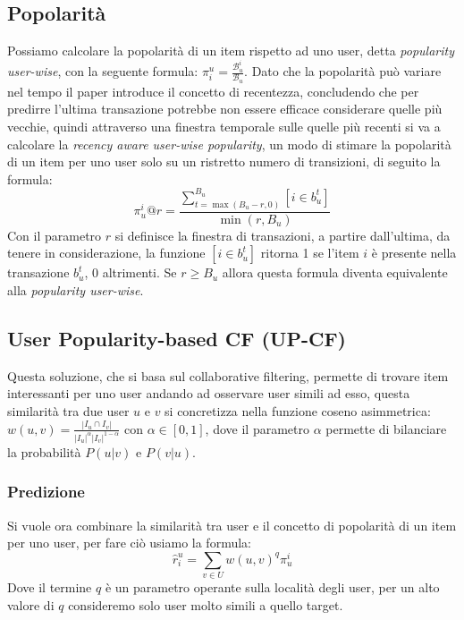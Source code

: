 \subsection{Popolarità}
Possiamo calcolare la popolarità di un item rispetto ad uno user, detta \textit{popularity user-wise}, con la seguente formula: $\pi_{i}^{u} = \frac{\mathcal{B}_{u}^{i}}{\mathcal{B}_{u}}$.
Dato che la popolarità può variare nel tempo il paper introduce il concetto di recentezza, concludendo che per predirre l'ultima transazione potrebbe non essere efficace considerare quelle più vecchie, quindi attraverso una finestra temporale sulle quelle più recenti si va a calcolare la \textit{recency aware user-wise popularity}, un modo di stimare la popolarità di un item per uno user solo su un ristretto numero di transizioni, di seguito la formula: 
$$\pi_{u}^{i}@r = \frac{\sum_{t = \max (B_{u}-r,0)}^{B_{u}}[i \in b_{u}^{t}]}{\min(r,B_{u})}$$
Con il parametro $r$ si definisce la finestra di transazioni, a partire dall'ultima, da tenere in considerazione, la funzione $[i \in b_{u}^{t}]$ ritorna 1 se l'item $i$ è presente nella transazione $b_{u}^{t}$, 0 altrimenti. Se $r \geqslant B_{u}$ allora questa formula diventa equivalente alla \textit{popularity user-wise}.
\subsection{User Popularity-based CF (UP-CF)}
Questa soluzione, che si basa sul collaborative filtering, permette di trovare item interessanti per uno user andando ad osservare user simili ad esso, questa similarità tra due user $u$ e $v$ si concretizza nella funzione coseno asimmetrica: $w(u,v) = \frac{|I_u \cap I_v|}{|I_u|^{\alpha}|I_v|^{1-\alpha}}$ con $\alpha \in [0,1]$, dove il parametro $\alpha$ permette di bilanciare la probabilità $P(u|v)$ e $P(v|u)$. 
\subsubsection{Predizione}
Si vuole ora combinare la similarità tra user e il concetto di popolarità di un item per uno user, per fare ciò usiamo la formula: 
$$\hat{r}_{i}^{u} = \sum_{v \in U} w(u,v)^{q}\pi_{u}^{i}$$
Dove il termine $q$ è un parametro operante sulla località degli user, per un alto valore di $q$ consideremo solo user molto simili a quello target.